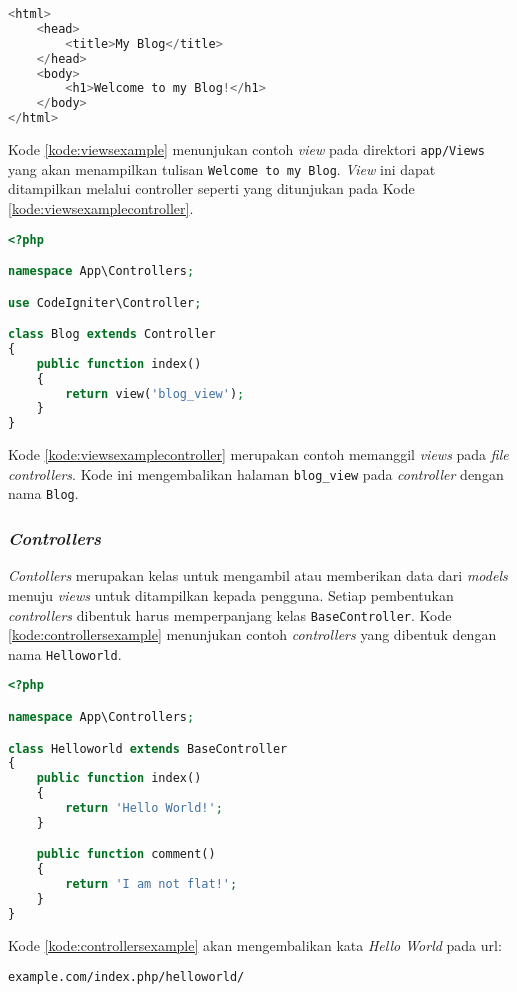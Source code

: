 \begin{lstlisting}[language=PHP, caption=Contoh \textit{Views},label=kode:viewsexample]
<html>
    <head>
        <title>My Blog</title>
    </head>
    <body>
        <h1>Welcome to my Blog!</h1>
    </body>
</html>
\end{lstlisting}

Kode \ref{kode:viewsexample} menunjukan contoh \textit{view} pada direktori \verb|app/Views| yang akan menampilkan tulisan \texttt{Welcome to my Blog}. \textit{View} ini dapat ditampilkan melalui controller seperti yang ditunjukan pada Kode \ref{kode:viewsexamplecontroller}.
\begin{lstlisting}[language=PHP, caption=Contoh menampilkan \textit{Views} pada \textit{controller},label=kode:viewsexamplecontroller]
<?php

namespace App\Controllers;

use CodeIgniter\Controller;

class Blog extends Controller
{
    public function index()
    {
        return view('blog_view');
    }
}
\end{lstlisting}

Kode \ref{kode:viewsexamplecontroller} merupakan contoh memanggil \textit{views} pada \textit{file controllers}. Kode ini mengembalikan halaman \texttt{blog\_view} pada \textit{controller} dengan nama \texttt{Blog}.

\subsubsection{\textit{Controllers}}

\textit{Contollers} merupakan kelas untuk mengambil atau memberikan data dari \textit{models} menuju \textit{views} untuk ditampilkan kepada pengguna. Setiap pembentukan \textit{controllers} dibentuk harus memperpanjang kelas \texttt{BaseController}. Kode \ref{kode:controllersexample} menunjukan contoh \textit{controllers} yang dibentuk dengan nama \texttt{Helloworld}.

\begin{lstlisting}[language=PHP, caption=Contoh \textit{Controllers} pada \textit{CodeIgniter 4},label=kode:controllersexample]
<?php

namespace App\Controllers;

class Helloworld extends BaseController
{
    public function index()
    {
        return 'Hello World!';
    }

    public function comment()
    {
        return 'I am not flat!';
    }
}
\end{lstlisting}
Kode \ref{kode:controllersexample} akan mengembalikan kata \textit{Hello World} pada url:
\begin{center}
\verb|example.com/index.php/helloworld/|
\end{center}

